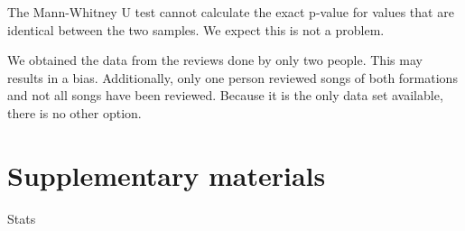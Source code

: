 \documentclass{article}
\begin{document}
The Mann-Whitney U test cannot calculate
the exact p-value for values that are identical
between the two samples. We expect this is
not a problem.

We obtained the data from the reviews done
by only two people. This may results in
a bias. 
Additionally, only one person reviewed
songs of both formations and not all
songs have been reviewed.
Because it is the only data
set available, there is no other option.

\section{Supplementary materials}

\begin{table}
  
  \caption{
    Stats
  }
  \label{table:stats}
\end{table}
 
\end{document}
